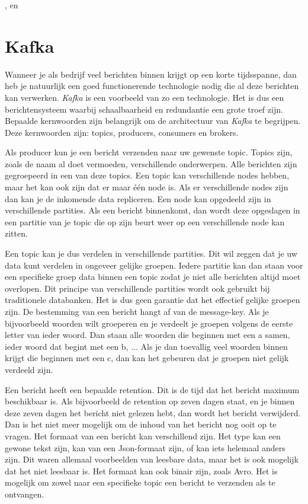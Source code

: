  \autocite{Claudio2017}, \autocite{Velthoven2016} en \autocite{Xu2019}

\section{Kafka}

Wanneer je als bedrijf veel berichten binnen krijgt op een korte tijdsspanne, dan heb je natuurlijk een goed functionerende technologie nodig die al deze berichten kan verwerken. \emph{Kafka} is een voorbeeld van zo een technologie. Het is dus een berichtensysteem waarbij schaalbaarheid en redundantie een grote troef zijn. Bepaalde kernwoorden zijn belangrijk om de architectuur van \emph{Kafka} te begrijpen. Deze kernwoorden zijn: topics, producers, consumers en brokers.  

Als producer kun je een bericht verzenden naar uw gewenste topic. Topics zijn, zoals de naam al doet vermoeden, verschillende onderwerpen. Alle berichten zijn gegroepeerd in een van deze topics. Een topic kan verschillende nodes hebben, maar het kan ook zijn dat er maar één node is. Als er verschillende nodes zijn dan kan je de inkomende data repliceren. Een node kan opgedeeld zijn in verschillende partities. Als een bericht binnenkomt, dan wordt deze opgeslagen in een partitie van je topic die op zijn beurt weer op een verschillende node kan zitten.

Een topic kan je dus verdelen in verschillende partities. Dit wil zeggen dat je uw data kunt verdelen in ongeveer gelijke groepen. Iedere partitie kan dan staan voor een specifieke groep data binnen een topic zodat je niet alle berichten altijd moet overlopen. Dit principe van verschillende partities wordt ook gebruikt bij traditionele databanken. Het is dus geen garantie dat het effectief gelijke groepen zijn. De bestemming van een bericht hangt af van de message-key. Als je bijvoorbeeld woorden wilt groeperen en je verdeelt je groepen volgens de eerste letter van ieder woord. Dan staan alle woorden die beginnen met een a samen, ieder woord dat begint met een b, ... Als je dan toevallig veel woorden binnen krijgt die beginnen met een c, dan kan het gebeuren dat je groepen niet gelijk verdeeld zijn.

Een bericht heeft een bepaalde retention. Dit is de tijd dat het bericht maximum beschikbaar is. Als bijvoorbeeld de retention op zeven dagen staat, en je binnen deze zeven dagen het bericht niet gelezen hebt, dan wordt het bericht verwijderd. Dan is het niet meer mogelijk om de inhoud van het bericht nog ooit op te vragen. Het formaat van een bericht kan verschillend zijn. Het type kan een gewone tekst zijn, kan van een Json-formaat zijn, of kan iets helemaal anders zijn. Dit waren allemaal voorbeelden van leesbare data, maar het is ook mogelijk dat het niet leesbaar is. Het formaat kan ook binair zijn, zoals Avro. Het is mogelijk om zowel naar een specifieke topic een bericht te verzenden als te ontvangen. 

